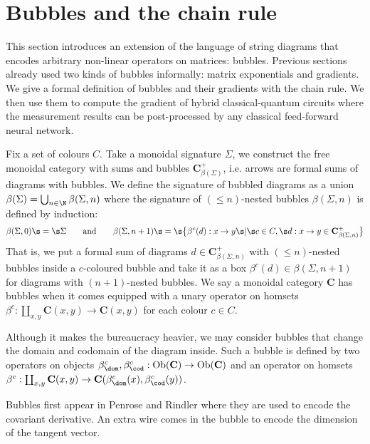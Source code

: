 
\section{Bubbles and the chain rule} \label{4-bubbles}

This section introduces an extension of the language of string diagrams
that encodes arbitrary non-linear operators on matrices: bubbles.
Previous sections already used two kinds of bubbles informally:
matrix exponentials and gradients. We give a formal definition of bubbles and
their gradients with the chain rule. We then use them to compute the gradient
of hybrid classical-quantum circuits where the measurement results can be
post-processed by any classical feed-forward neural network.

Fix a set of colours $C$.
Take a monoidal signature $\Sigma$, we construct the free monoidal category with
sums and bubbles $\mathbf{C}_{\beta(\Sigma)}^+$, i.e. arrows are formal sums of
diagrams with bubbles. We define the signature of bubbled diagrams
as a union $\beta(\Sigma) = \bigcup_{n \in \N} \beta(\Sigma, n)$ where the
signature of $(\leq n)$-nested bubbles $\beta(\Sigma, n)$ is defined by
induction:
$$
\beta(\Sigma, 0) \s = \s \Sigma \qquad \text{and} \qquad
\beta(\Sigma, n + 1) \s = \s \big\{\beta^c(d) : x \to y \s \vert \s
c \in C, \s d : x \to y \in \mathbf{C}_{\beta(\Sigma, n)}^+ \big\}$$
That is, we put a formal sum of diagrams $d \in \mathbf{C}_{\beta(\Sigma, n)}^+$
with $(\leq n)$-nested bubbles inside a $c$-coloured bubble and take it as a box
$\beta^c(d) \in \beta(\Sigma, n + 1)$ for diagrams with $(n + 1)$-nested
bubbles.
We say a monoidal category $\mathbf{C}$ has bubbles when it comes equipped with
a unary operator on homsets $\beta^c :
\coprod_{x, y} \mathbf{C}(x, y) \to \mathbf{C}(x, y)$ for each colour $c \in C$.

Although it makes the bureaucracy heavier, we may consider bubbles that change
the domain and codomain of the diagram inside. Such a bubble is defined by two
operators on objects
$\beta^c_\dom, \beta^c_\cod : \text{Ob}(\mathbf{C}) \to \text{Ob}(\mathbf{C})$
and an operator on homsets $\beta^c : \coprod_{x, y}
\mathbf{C}(x, y) \to \mathbf{C}(\beta^c_\dom(x), \beta^c_\cod(y))$.

\begin{example}
Bubbles first appear in Penrose and Rindler \cite{PenroseRindler84}
where they are used to encode the covariant derivative. An extra wire comes in
the bubble to encode the dimension of the tangent vector.
\end{example}

